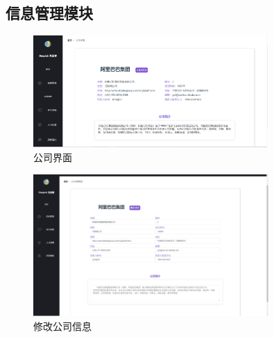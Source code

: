 \documentclass[UTF8]{ctexart}
\begin{document}
\subsection{信息管理模块}
\begin{figure}[H]
	\centering
	\includegraphics[width=0.8\textwidth]{4.png}
	\caption{公司界面}
\end{figure}
\begin{figure}[H]
	\centering
	\includegraphics[width=0.8\textwidth]{5.png}
	\caption{修改公司信息}
\end{figure}
\end{document}

